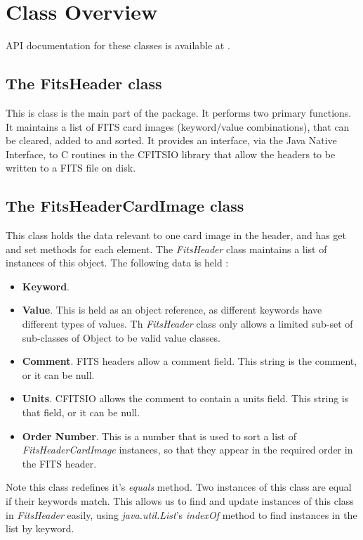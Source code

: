 \documentclass[10pt,a4paper]{article}
\begin{document}
\section{Class Overview}
API documentation for these classes is available at \cite{bib:ngatfitsapi}.

\subsection{The FitsHeader class}
This is class is the main part of the package. It performs two primary functions. It maintains a list
of FITS card images (keyword/value combinations), that can be cleared, added to and sorted. It
provides an interface, via the Java Native Interface, to C routines in the CFITSIO library that
allow the headers to be written to a FITS file on disk.

\subsection{The FitsHeaderCardImage class}
This class holds the data relevant to one card image in the header, and has get and set methods for each
element. The {\em FitsHeader} class maintains a list of instances of this object. The following data
is held :
\begin{itemize}
\item {\bf Keyword}.
\item {\bf Value}. This is held as an object reference, as different keywords have different types of values.
	Th {\em FitsHeader} class only allows a limited sub-set of sub-classes of Object to be valid value classes.
\item {\bf Comment}. FITS headers allow a comment field. This string is the comment, or it can be null.
\item {\bf Units}. CFITSIO allows the comment to contain a units field. This string is that field, or it can
	be null.
\item {\bf Order Number}. This is a number that is used to sort a list of {\em FitsHeaderCardImage} instances,
	so that they appear in the required order in the FITS header.
\end{itemize}

Note this class redefines it's {\em equals} method. Two instances of this class are equal if their
keywords match. This allows us to find and update instances of this class in {\em FitsHeader} easily,
using {\em java.util.List}'s {\em indexOf} method to find instances in the list by keyword.
\end{document}
